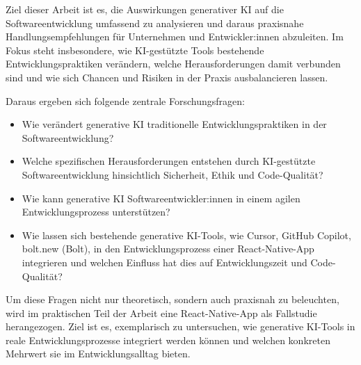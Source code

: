 
Ziel dieser Arbeit ist es, die Auswirkungen generativer KI auf die
Softwareentwicklung umfassend zu analysieren und daraus praxisnahe
Handlungsempfehlungen für Unternehmen und Entwickler:innen abzuleiten. Im Fokus
steht insbesondere, wie KI-gestützte Tools bestehende Entwicklungspraktiken
verändern, welche Herausforderungen damit verbunden sind und wie sich Chancen
und Risiken in der Praxis ausbalancieren lassen.

Daraus ergeben sich folgende zentrale Forschungsfragen:
\begin{itemize}
      \item Wie verändert generative KI traditionelle Entwicklungspraktiken in der
            Softwareentwicklung?
      \item Welche spezifischen Herausforderungen entstehen durch KI-gestützte
            Softwareentwicklung hinsichtlich Sicherheit, Ethik und Code-Qualität?
      \item Wie kann generative KI Softwareentwickler:innen in einem agilen
            Entwicklungsprozess unterstützen?
      \item Wie lassen sich bestehende generative KI-Tools, wie Cursor, GitHub Copilot,
            bolt.new (Bolt), in den Entwicklungsprozess einer React-Native-App integrieren
            und welchen Einfluss hat dies auf Entwicklungszeit und Code-Qualität?
\end{itemize}

Um diese Fragen nicht nur theoretisch, sondern auch praxisnah zu beleuchten,
wird im praktischen Teil der Arbeit eine React-Native-App als Fallstudie
herangezogen. Ziel ist es, exemplarisch zu untersuchen, wie generative KI-Tools
in reale Entwicklungsprozesse integriert werden können und welchen konkreten
Mehrwert sie im Entwicklungsalltag bieten.
